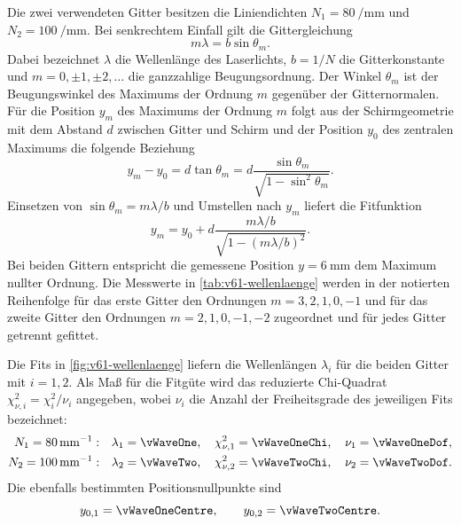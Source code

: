 Die zwei verwendeten Gitter besitzen die Liniendichten $N_1=\qty[per-mode=reciprocal]{80}{\per\milli\meter}$
und $N_2=\qty[per-mode=reciprocal]{100}{\per\milli\meter}$. 
Bei senkrechtem Einfall gilt die Gittergleichung
\begin{equation*}
  m\lambda=b\sin\theta_m.
\end{equation*}
Dabei bezeichnet $\lambda$ die Wellenlänge des Laserlichts, $b=1/N$ die Gitterkonstante und
$m=0,\pm1,\pm2,\ldots$ die ganzzahlige Beugungsordnung.
Der Winkel $\theta_m$ ist der Beugungswinkel des Maximums der Ordnung $m$
gegenüber der Gitternormalen.
Für die Position $y_m$ des Maximums der Ordnung $m$ folgt aus der
Schirmgeometrie mit dem Abstand $d$ zwischen Gitter und Schirm und der Position $y_0$
des zentralen Maximums die folgende Beziehung
\begin{equation*}
  y_m-y_0=d\tan\theta_m
  =d\frac{\sin\theta_m}{\sqrt{1-\sin^2\theta_m}}.
\end{equation*}
Einsetzen von $\sin\theta_m=m\lambda/b$ und Umstellen nach $y_m$
liefert die Fitfunktion
\begin{equation}
  y_m=y_0+d\frac{m\lambda/b}{\sqrt{1-(m\lambda/b)^2}}.
  \label{eq:v61-gitter}
\end{equation}
Bei beiden Gittern entspricht die gemessene Position $y=\qty{6}{\milli\meter}$
dem Maximum nullter Ordnung. Die Messwerte in \autoref{tab:v61-wellenlaenge}
werden in der notierten Reihenfolge für das erste Gitter den Ordnungen
$m=3,2,1,0,-1$ und für das zweite Gitter den Ordnungen $m=2,1,0,-1,-2$
zugeordnet und für jedes Gitter getrennt gefittet.



Die Fits in \autoref{fig:v61-wellenlaenge} liefern die Wellenlängen
$\lambda_i$ für die beiden Gitter mit $i=1,2$. Als Maß für die Fitgüte wird
das reduzierte Chi-Quadrat $\chi^2_{\nu,i}=\chi_i^2/\nu_i$ angegeben,
wobei $\nu_i$ die Anzahl der Freiheitsgrade des jeweiligen Fits bezeichnet:
\begin{align*}
  N_1=\qty[per-mode=reciprocal]{80}{\per\milli\meter}:\quad
  &\lambda_1=\vWaveOne,\quad
  \chi^2_{\nu,1}=\vWaveOneChi,\quad \nu_1=\vWaveOneDof, \\
  N_2=\qty[per-mode=reciprocal]{100}{\per\milli\meter}:\quad
  &\lambda_2=\vWaveTwo,\quad
  \chi^2_{\nu,2}=\vWaveTwoChi,\quad \nu_2=\vWaveTwoDof.
\end{align*}
Die ebenfalls bestimmten Positionsnullpunkte sind
\begin{equation*}
  y_{0,1}=\vWaveOneCentre,\qquad y_{0,2}=\vWaveTwoCentre.
\end{equation*}

